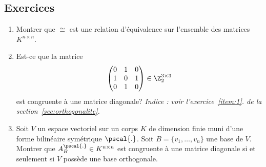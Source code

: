 \subsection*{Exercices}

\begin{enumerate}
\item Montrer que $\cong$ est une relation d'équivalence sur l'ensemble des matrices $K^{n\times n}$. 
\item Est-ce que la matrice 
  \begin{displaymath}
    \begin{pmatrix}
      0 & 1 & 0 \\
      1 & 0 & 1\\
      0 & 1 & 0 
    \end{pmatrix} \in \Z_2^{3\times 3} 
  \end{displaymath}
  est congruente à une matrice diagonale? \emph{Indice : voir l'exercice~\ref{item:1}. de la section~\ref{sec:orthogonalite}.}  
\item Soit $V$ un espace vectoriel  sur un corps $K$ de dimension finie muni d'une forme bilinéaire symétrique $\pscal{.}$. Soit $B = \{v_1,\dots,v_n\}$ une base de $V$. Montrer que $A_B^{\pscal{.}} \in K^{n \times n}$ est congruente à une matrice diagonale si  et seulement si $V$ possède une base orthogonale. 


\end{enumerate}
